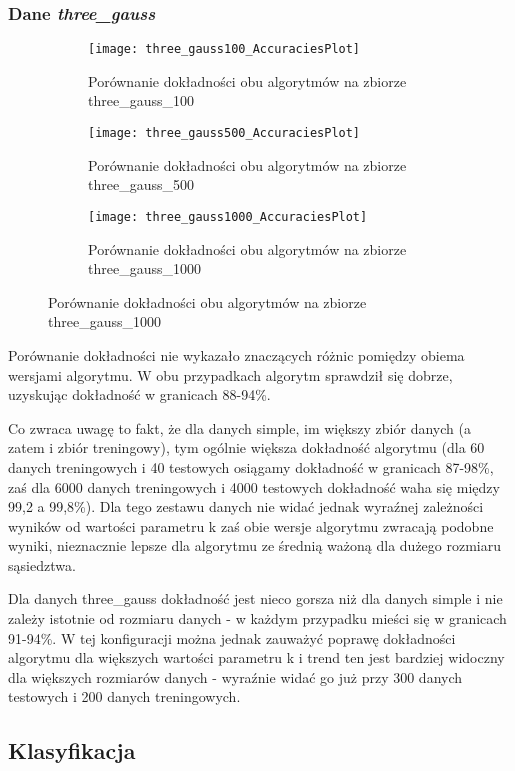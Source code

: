 \documentclass{scrartcl}
\begin{document}
\subsubsection*{Dane \textit{three\_gauss} }

\begin{figure}[H]
	\centering
	\begin{subfigure}[b]{0.4\linewidth}
		\texttt{[image: three\_gauss100\_AccuraciesPlot]}
		\caption{Porównanie dokładności obu algorytmów na zbiorze three\_gauss\_100}
	\end{subfigure}
	\begin{subfigure}[b]{0.4\linewidth}
		\texttt{[image: three\_gauss500\_AccuraciesPlot]}
		\caption{Porównanie dokładności obu algorytmów na zbiorze three\_gauss\_500}
	\end{subfigure}
	\begin{subfigure}[b]{0.4\linewidth}
		\texttt{[image: three\_gauss1000\_AccuraciesPlot]}
		\caption{Porównanie dokładności obu algorytmów na zbiorze three\_gauss\_1000}
	\end{subfigure}
\end{figure}

Porównanie dokładności nie wykazało znaczących różnic pomiędzy obiema wersjami algorytmu. W obu przypadkach algorytm sprawdził się dobrze, uzyskując dokładność w granicach 88-94\%. 

Co zwraca uwagę to fakt, że dla danych simple, im większy zbiór danych (a zatem i zbiór treningowy), tym ogólnie większa dokładność algorytmu (dla 60 danych treningowych i 40 testowych osiągamy dokładność w granicach 87-98\%, zaś dla 6000 danych treningowych i 4000 testowych dokładność waha się między 99,2 a 99,8\%). Dla tego zestawu danych nie widać jednak wyraźnej zależności wyników od wartości parametru k zaś obie wersje algorytmu zwracają podobne wyniki, nieznacznie lepsze dla algorytmu ze średnią ważoną dla dużego rozmiaru sąsiedztwa. 

Dla danych three\_gauss dokładność jest nieco gorsza niż dla danych simple i nie zależy istotnie od rozmiaru danych - w każdym przypadku mieści się w granicach 91-94\%. W tej konfiguracji można jednak zauważyć poprawę dokładności algorytmu dla większych wartości parametru k i trend ten jest bardziej widoczny dla większych rozmiarów danych - wyraźnie widać go już przy 300 danych testowych i 200 danych treningowych.

\subsection*{Klasyfikacja}
\end{document}
